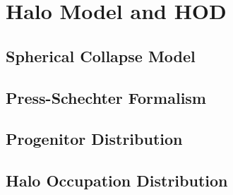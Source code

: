 \chapter{Halo Model and HOD}

\section{Spherical Collapse Model}

\section{Press-Schechter Formalism}

\section{Progenitor Distribution}

\section{Halo Occupation Distribution}